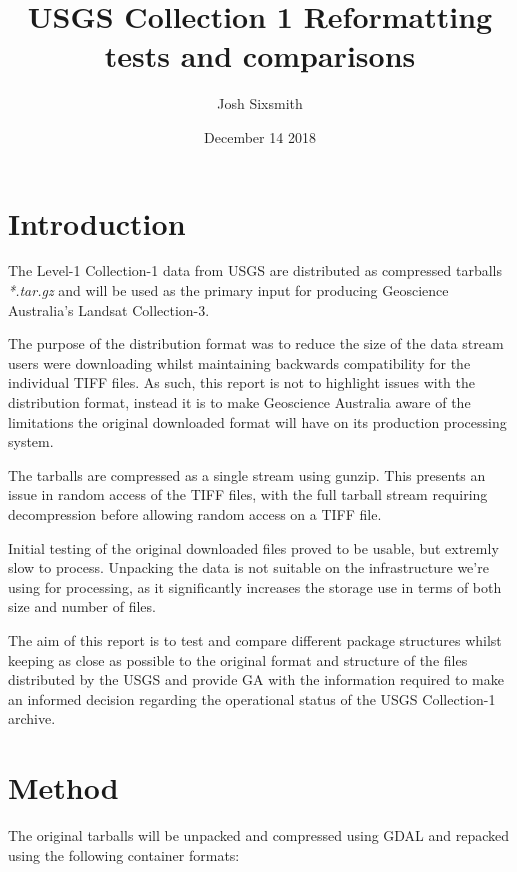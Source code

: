 \documentclass[a4paper]{article}
\title{USGS Collection 1 Reformatting tests and comparisons}
\date{December 14 2018}
\author{Josh Sixsmith}
\begin{document}
  \maketitle
  \newpage

  \section{Introduction}

    \begin{flushleft}
    The Level-1 Collection-1 data from USGS are distributed as compressed tarballs \textit{*.tar.gz} and will be used as the primary input for producing Geoscience Australia's Landsat Collection-3. \par
    The purpose of the distribution format was to reduce the size of the data stream users were downloading whilst maintaining backwards compatibility for the individual TIFF files. As such, this report is not to highlight issues with the distribution format, instead it is to make Geoscience Australia aware of the limitations the original downloaded format will have on its production processing system. \par
    The tarballs are compressed as a single stream using gunzip. This presents an issue in random access of the TIFF files, with the full tarball stream requiring decompression before allowing random access on a TIFF file. \par
    Initial testing of the original downloaded files proved to be usable, but extremly slow to process. Unpacking the data is not suitable on the infrastructure we're using for processing, as it significantly increases the storage use in terms of both size and number of files. \par
    The aim of this report is to test and compare different package structures whilst keeping as close as possible to the original format and structure of the files distributed by the USGS and provide GA with the information required to make an informed decision regarding the operational status of the USGS Collection-1 archive.
    \end{flushleft}

  \section{Method}

    The original tarballs will be unpacked and compressed using GDAL and repacked using the following container formats:
\end{document}
